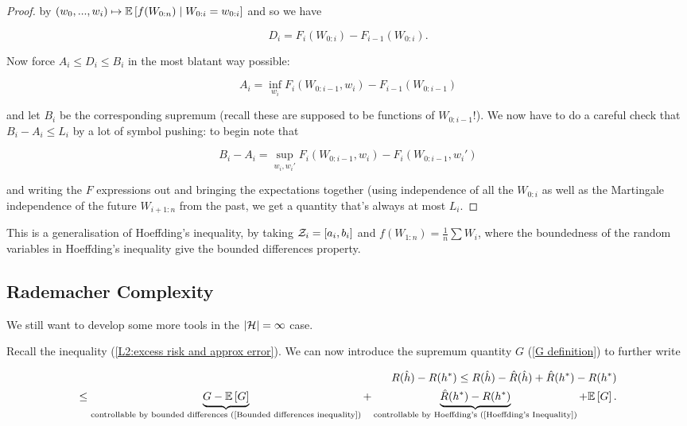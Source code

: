 \documentclass[11pt]{scrartcl}
\begin{document}
\begin{theorem}
\begin{proof}
by $(w_0, ... , w_i) \mapsto \mathbb{E} \left[ f(W_{0:n}) \mid W_{0:i} = w_{0:i} \right]$ and so we have

\begin{equation}
    D_i = F_i(W_{0:i}) - F_{i-1}(W_{0:i}).
\end{equation}

Now force $A_i \le D_i \le B_i$ in the most blatant way possible:

\begin{equation}
    A_i = \inf_{w_i} F_i(W_{0:i-1},w_i) - F_{i-1}(W_{0:i-1})
\end{equation}

and let $B_i$ be the corresponding supremum (recall these are supposed to be functions of $W_{0:i-1}$!). We now have to do a careful check that $B_i - A_i \le L_i$ by a lot of symbol pushing: to begin note that 

\begin{equation}
    B_i - A_i = \sup_{w_i, w_i'} F_i(W_{0:i-1}, w_i) - F_i(W_{0:i-1}, w_i')
\end{equation}

and writing the $F$ expressions out and bringing the expectations together (using independence of all the $W_{0:i}$ as well as the Martingale independence of the future $W_{i+1:n}$ from the past, we get a quantity that's always at most $L_i$.


\end{proof}
\end{theorem}

This is a generalisation of Hoeffding's inequality, by taking $\mathcal{Z}_i = [a_i, b_i]$ and $f(W_{1:n}) = \frac1n \sum W_i$, where the boundedness of the random variables in Hoeffding's inequality give the bounded differences property.

\subsection{Rademacher Complexity}

We still want to develop some more tools in the $|\mathcal{H}| = \infty$ case.

Recall the inequality (\ref{L2:excess risk and approx error}). We can now introduce the supremum quantity $G$ (\ref{G definition}) to further write

\begin{align}
    R(\hat{h}) - R(h^*) \le R(\hat{h}) - \hat{R}(\hat{h}) + \hat{R}(h^*) - R(h^*) \\
    \le \underbrace{G - \mathbb{E} \left[ G \right]}_{\text{controllable by bounded differences (\ref{Bounded differences inequality})}} + \underbrace{\hat{R}(h^*) - R(h^*)}_{\text{controllable by Hoeffding's (\ref{Hoeffding's Inequality})}} + \mathbb{E} \left[ G \right].
\end{align}
\end{document}

